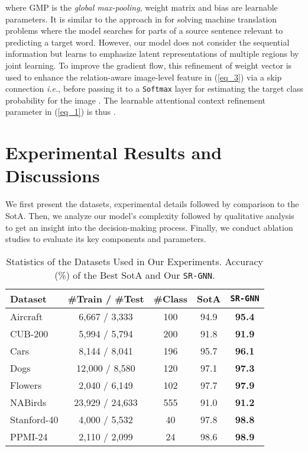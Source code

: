 \documentclass[journal]{IEEEtran}
\begin{document}
where GMP is the \textit{global max-pooling}, weight matrix  and bias  are learnable parameters. It is similar to the approach in \cite{BahdanauCB14} for solving machine translation problems where the model searches for parts of a source sentence relevant to predicting a target word. However, our model does not consider the sequential information but learns to emphasize latent representations of multiple regions by joint learning. To improve the gradient flow, this refinement of weight vector  is used to enhance the relation-aware image-level feature  in (\ref{eq_3}) via a skip connection \textit{i.e.},   before passing it to a \texttt{Softmax} layer for estimating the target class probability  for the image . The learnable attentional context refinement parameter in (\ref{eq_1}) is thus .
\section{Experimental Results and Discussions} \label{experiments}
We first present the datasets, experimental details followed by comparison to the SotA. Then, we analyze our model's complexity followed by qualitative analysis to get an insight into the  decision-making process. Finally, we conduct ablation studies to evaluate its key components and parameters. 

\begin{table}
\begin{center}
 \caption{Statistics of the Datasets Used in Our Experiments. Accuracy (\%) of the Best SotA and Our \texttt{SR-GNN}.  }
 \label{table:overall_accuracy}
\begin{tabular}{|l| c c c c|}
 \hline
Dataset &  \#Train / \#Test & \#Class & SotA & \texttt{SR-GNN} \\
    \hline
Aircraft & 6,667 / 3,333 &100 &94.9 \cite{behera2021context}  & \textbf{95.4} \\ 
CUB-200 & 5,994 / 5,794 &200 &91.8 \cite{behera2021context} &\textbf{91.9} \\ 
Cars & 8,144 / 8,041 &196 & 95.7 \cite{behera2021context} &\textbf{96.1} \\ 
 Dogs & 12,000 / 8,580 &120 &97.1\cite{ge2019weakly} &\textbf{97.3} \\ Flowers & 2,040 / 6,149 &102  &97.7 \cite{chang2020devil} &\textbf{97.9} \\ 
NABirds &23,929 / 24,633 &555 &91.0 \cite{behera2021context} &\textbf{91.2} \\
\hline
Stanford-40 & 4,000 / 5,532 &40 &97.8 \cite{bera2021attend} &\textbf{98.8} \\
PPMI-24 & 2,110 / 2,099 &24 &98.6 \cite{behera2020regional} &\textbf{98.9} \\

\hline
\end{tabular}
\end{center}
 \vspace{-0.5cm}
\end{table}
\end{document}
